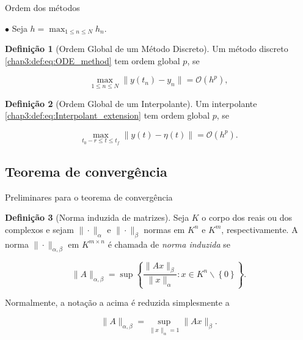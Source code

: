 \documentclass{beamer}
\theoremstyle{plain}
\theoremstyle{definition}
\newtheorem{defi}{Definição}
\begin{document}
\begin{frame}{Ordem dos métodos}

    \small

    \phantom{aa} $\bullet$ Seja $h = \max_{1 \leq n \leq N} h_n$.


    \begin{defi}[Ordem Global de um Método Discreto]
        
        Um método discreto \eqref{chap3:def:eq:ODE_method} tem ordem global $p$, se 

        \begin{equation}
            \max_{1 \leq n \leq N} \| y(t_n) - y_n \| = \mathcal{O}(h^p),
        \end{equation}
    \end{defi}


    \begin{defi}[Ordem Global de um Interpolante]
        
        Um interpolante \eqref{chap3:def:eq:Interpolant_extension} tem ordem global $p$, se 

        \begin{equation}
            \max_{t_0 - r \leq t \leq t_f} \| y(t) - \eta(t) \| = \mathcal{O}(h^{p}).
        \end{equation}
    \end{defi}

\end{frame}

\subsection{Teorema de convergência}

\begin{frame}{Preliminares para o teorema de convergência}
    \begin{defi}[Norma induzida de matrizes]
        \label{apendices:def:induced_matrix_norm}
        Seja $K$ o corpo dos reais ou dos complexos e sejam $\|\cdot\|_\alpha$ e $\|\cdot\|_\beta$ normas em $K^n$ e $K^m$, respectivamente.
        A norma $\| \cdot \|_{\alpha, \beta}$ em $K^{m \times n}$ é chamada de \textit{norma induzida} se 

        \[ \| A \|_{\alpha, \beta} = \sup\left\{\frac{\|Ax\|_\beta}{\|x\|_\alpha} : x\in K^n \backslash \left\{0\right\} \right\}. \]


        Normalmente, a notação a acima é reduzida simplesmente a 

        \[ \| A \|_{\alpha, \beta} = \sup_{\|x\|_\alpha = 1} \|Ax\|_\beta.\]

    \end{defi}


\end{frame}
\end{document}

